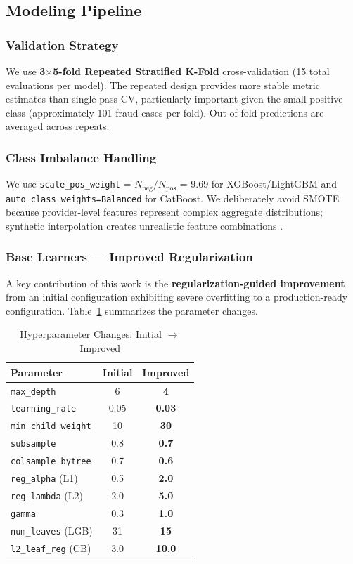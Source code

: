 \documentclass[conference]{IEEEtran}
\begin{document}
\subsection{Modeling Pipeline}

\subsubsection{Validation Strategy}
We use \textbf{3$\times$5-fold Repeated Stratified K-Fold} cross-validation (15 total evaluations per model). The repeated design provides more stable metric estimates than single-pass CV, particularly important given the small positive class (approximately 101 fraud cases per fold). Out-of-fold predictions are averaged across repeats.

\subsubsection{Class Imbalance Handling}
We use \texttt{scale\_pos\_weight} = $N_{\text{neg}} / N_{\text{pos}}$ = 9.69 for XGBoost/LightGBM and \texttt{auto\_class\_weights=Balanced} for CatBoost. We deliberately avoid SMOTE because provider-level features represent complex aggregate distributions; synthetic interpolation creates unrealistic feature combinations \cite{vandenheuvel2022}.

\subsubsection{Base Learners --- Improved Regularization}

A key contribution of this work is the \textbf{regularization-guided improvement} from an initial configuration exhibiting severe overfitting to a production-ready configuration. Table~\ref{tab:params} summarizes the parameter changes.

\begin{table}[t]
\caption{Hyperparameter Changes: Initial $\to$ Improved}
\label{tab:params}
\centering
\small
\begin{tabular}{@{}lcc@{}}
\toprule
\textbf{Parameter} & \textbf{Initial} & \textbf{Improved} \\
\midrule
\texttt{max\_depth} & 6 & \textbf{4} \\
\texttt{learning\_rate} & 0.05 & \textbf{0.03} \\
\texttt{min\_child\_weight} & 10 & \textbf{30} \\
\texttt{subsample} & 0.8 & \textbf{0.7} \\
\texttt{colsample\_bytree} & 0.7 & \textbf{0.6} \\
\texttt{reg\_alpha} (L1) & 0.5 & \textbf{2.0} \\
\texttt{reg\_lambda} (L2) & 2.0 & \textbf{5.0} \\
\texttt{gamma} & 0.3 & \textbf{1.0} \\
\texttt{num\_leaves} (LGB) & 31 & \textbf{15} \\
\texttt{l2\_leaf\_reg} (CB) & 3.0 & \textbf{10.0} \\
\bottomrule
\end{tabular}
\vspace{-2mm}
\end{table}
\end{document}
